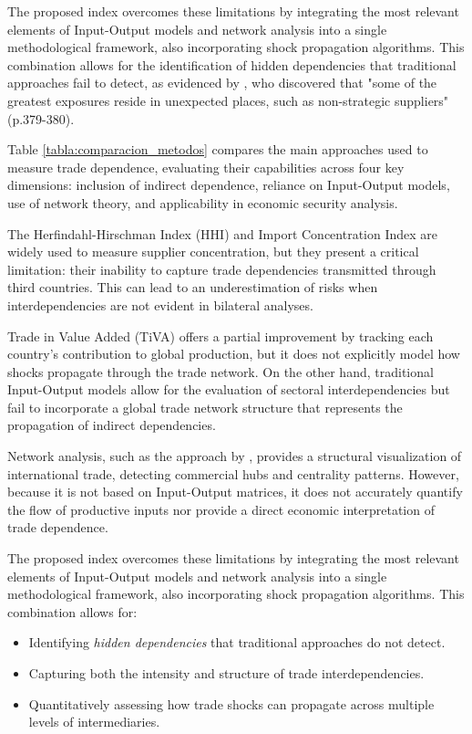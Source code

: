 \documentclass[final,1p,times,authoryear]{elsarticle}
\begin{document}
The proposed index overcomes these limitations by integrating the most relevant elements of Input-Output models and network analysis into a single methodological framework, also incorporating shock propagation algorithms. This combination allows for the identification of hidden dependencies that traditional approaches fail to detect, as evidenced by \citet{SimchiLevi2015}, who discovered that "some of the greatest exposures reside in unexpected places, such as non-strategic suppliers" (p.379-380).

Table \ref{tabla:comparacion_metodos} compares the main approaches used to measure trade dependence, evaluating their capabilities across four key dimensions: inclusion of indirect dependence, reliance on Input-Output models, use of network theory, and applicability in economic security analysis.

The Herfindahl-Hirschman Index (HHI) and Import Concentration Index are widely used to measure supplier concentration, but they present a critical limitation: their inability to capture trade dependencies transmitted through third countries. This can lead to an underestimation of risks when interdependencies are not evident in bilateral analyses.

Trade in Value Added (TiVA) offers a partial improvement by tracking each country’s contribution to global production, but it does not explicitly model how shocks propagate through the trade network. On the other hand, traditional Input-Output models allow for the evaluation of sectoral interdependencies but fail to incorporate a global trade network structure that represents the propagation of indirect dependencies.

Network analysis, such as the approach by \citet{Korniyenko2017}, provides a structural visualization of international trade, detecting commercial hubs and centrality patterns. However, because it is not based on Input-Output matrices, it does not accurately quantify the flow of productive inputs nor provide a direct economic interpretation of trade dependence.

The proposed index overcomes these limitations by integrating the most relevant elements of Input-Output models and network analysis into a single methodological framework, also incorporating shock propagation algorithms. This combination allows for:

\begin{itemize}
    \item Identifying \textit{hidden dependencies} that traditional approaches do not detect.
    \item Capturing both the intensity and structure of trade interdependencies.
    \item Quantitatively assessing how trade shocks can propagate across multiple levels of intermediaries.
\end{itemize}
\end{document}
